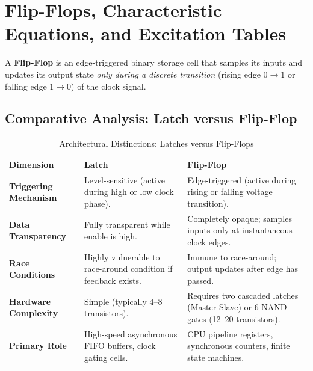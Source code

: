 \section{Flip-Flops, Characteristic Equations, and Excitation Tables}
\label{sec:flip_flops}

A \textbf{Flip-Flop} is an edge-triggered binary storage cell that samples its inputs and updates its output state \textit{only during a discrete transition} (rising edge $0 \to 1$ or falling edge $1 \to 0$) of the clock signal.

\subsection{Comparative Analysis: Latch versus Flip-Flop}
\begin{table}[htbp]
\centering
\small
\caption{Architectural Distinctions: Latches versus Flip-Flops}
\label{tab:latch_vs_flipflop}
\begin{tabularx}{\textwidth}{l X X}
\toprule
\textbf{Dimension} & \textbf{Latch} & \textbf{Flip-Flop} \\
\midrule
\textbf{Triggering Mechanism} & Level-sensitive (active during high or low clock phase). & Edge-triggered (active during rising or falling voltage transition). \\
\textbf{Data Transparency} & Fully transparent while enable is high. & Completely opaque; samples inputs only at instantaneous clock edges. \\
\textbf{Race Conditions} & Highly vulnerable to race-around condition if feedback exists. & Immune to race-around; output updates after edge has passed. \\
\textbf{Hardware Complexity} & Simple (typically 4--8 transistors). & Requires two cascaded latches (Master-Slave) or 6 NAND gates (12--20 transistors). \\
\textbf{Primary Role} & High-speed asynchronous FIFO buffers, clock gating cells. & CPU pipeline registers, synchronous counters, finite state machines. \\
\bottomrule
\end{tabularx}
\end{table}

